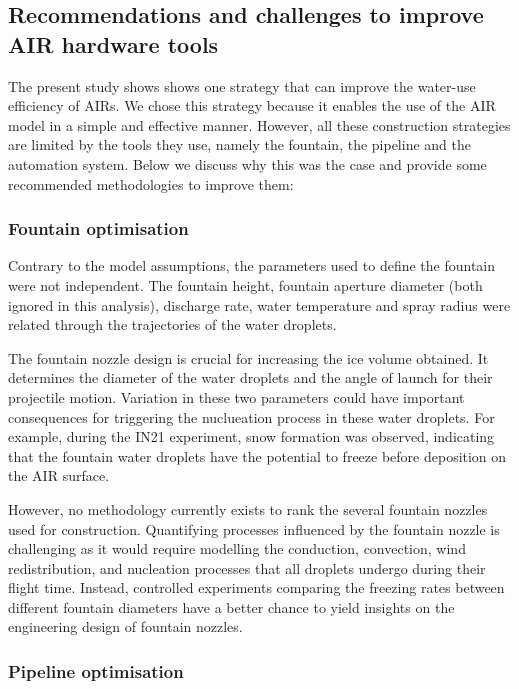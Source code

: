 \documentclass[tc, manuscript]{copernicus}
\begin{document}
\subsection{Recommendations and challenges to improve AIR hardware tools}

The present study shows shows one strategy that can improve the water-use efficiency of AIRs. We chose this
strategy because it enables the use of the AIR model in a simple and effective manner. However, all these
construction strategies are limited by the tools they use, namely the fountain, the pipeline and the automation
system. Below we discuss why this was the case and provide some recommended methodologies to improve them:

\subsubsection{Fountain optimisation}

Contrary to the model assumptions, the parameters used to define the fountain were not independent. The fountain
height, fountain aperture diameter (both ignored in this analysis), discharge rate, water temperature and spray
radius were related through the trajectories of the water droplets.

The fountain nozzle design is crucial for increasing the ice volume obtained. It determines the diameter of the
water droplets and the angle of launch for their projectile motion. Variation in these two parameters could have
important consequences for triggering the nuclueation process in these water droplets. For example, during the IN21
experiment, snow formation was observed, indicating that the fountain water droplets have the potential to
freeze before deposition on the AIR surface. 

However, no methodology currently exists to rank the several fountain nozzles used for construction. Quantifying
processes influenced by the fountain nozzle is challenging as it would require modelling the conduction,
convection, wind redistribution, and nucleation processes that all droplets undergo during their flight time.
Instead, controlled experiments comparing the freezing rates between different fountain diameters have a better
chance to yield insights on the engineering design of fountain nozzles.

\subsubsection{Pipeline optimisation}
\end{document}
